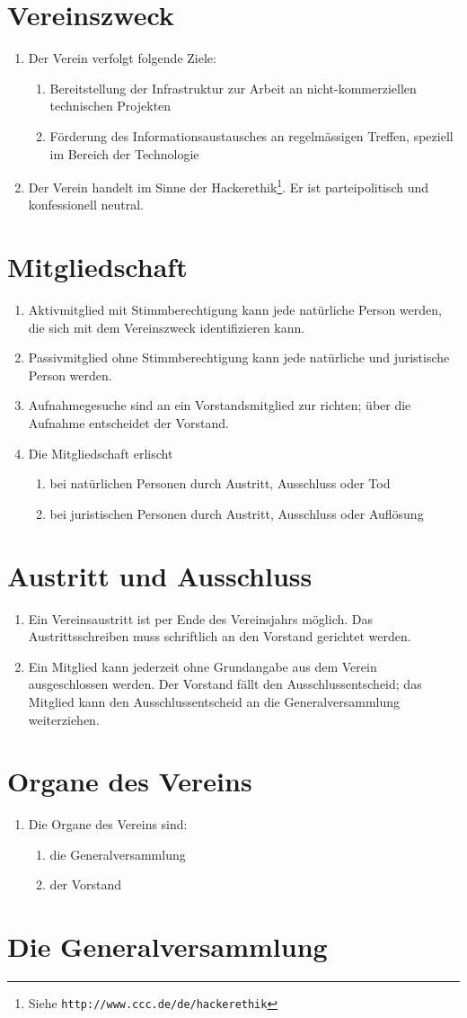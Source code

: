 \documentclass[10pt,a4paper,parskip,fleqn]{scrartcl}
\newcommand{\ol}{\begin{enumerate}[itemsep=-0.2em,topsep=-0.2em]}
\newcommand{\lo}{\end{enumerate}}
\newcommand{\li}{\item}
\begin{document}
\section{Vereinszweck}

\ol
	\li Der Verein verfolgt folgende Ziele:
    \ol
      \li Bereitstellung der Infrastruktur zur Arbeit an nicht-kommerziellen
			technischen Projekten
      \li Förderung des Informationsaustausches an regelmässigen Treffen,
			speziell im Bereich der Technologie
    \lo
		\li Der Verein handelt im Sinne der
		Hackerethik\footnote{Siehe \texttt{http://www.ccc.de/de/hackerethik}}. Er
		ist parteipolitisch und konfessionell neutral.
\lo


\section{Mitgliedschaft}

\ol
  \li Aktivmitglied mit Stimmberechtigung kann jede natürliche Person werden,
	die sich mit dem Vereinszweck identifizieren kann.
	\li Passivmitglied ohne Stimmberechtigung kann jede natürliche und juristische
	Person werden.
	\li Aufnahmegesuche sind an ein Vorstandsmitglied zur richten; über die
	Aufnahme entscheidet der Vorstand.
	\li Die Mitgliedschaft erlischt
		\ol
			\li bei natürlichen Personen durch Austritt, Ausschluss oder Tod
			\li bei juristischen Personen durch Austritt, Ausschluss oder Auflösung
		\lo
\lo


\section{Austritt und Ausschluss}

\ol
	\li Ein Vereinsaustritt ist per Ende des Vereinsjahrs möglich. Das
	Austrittsschreiben muss schriftlich an den Vorstand gerichtet werden.
	\li Ein Mitglied kann jederzeit ohne Grundangabe aus dem Verein ausgeschlossen
	werden. Der Vorstand fällt den Ausschlussentscheid; das Mitglied kann den
	Ausschlussentscheid an die Generalversammlung weiterziehen.
\lo


\section{Organe des Vereins}

\ol
	\li Die Organe des Vereins sind:
		\ol
			\li die Generalversammlung
			\li der Vorstand
		\lo
\lo


\section{Die Generalversammlung}
\end{document}
